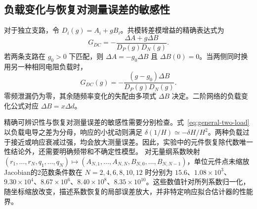 \subsection{负载变化与恢复对测量误差的敏感性}

对于独立支路，令 $D_i(g)=A_i+gB_i$。共模转差模增益的精确表达式为
\begin{equation}\label{eq:general-leakage}
G_{DC}=-\frac{\Delta A+g\Delta B}{D_P(g)D_N(g)}.
\end{equation}
若两条支路在 $g_0>0$ 下匹配，则 $\Delta A=-g_0\Delta B$ 且 $\Delta B(0)=0$。当两侧同时换用另一种相同电阻负载时，
\begin{equation}\label{eq:general-load-shift}
G_{DC}(g)=-\frac{(g-g_0)\Delta B}{D_P(g)D_N(g)}.
\end{equation}
零频泄漏仍为零，其余随频率变化的失配由多项式 $\Delta B$ 决定。二阶网络的负载变化公式对应 $\Delta B=x\Delta d$。

精确可辨识性与恢复对测量误差的敏感性需要分别检查。式~\eqref{eq:general-two-load} 以负载电导之差为分母，响应的小扰动则满足 $\delta(1/H)\simeq-\delta H/H^2$。两种负载过于接近或响应衰减过强，均会放大测量误差。因此，实验中的元件恢复除代数唯一性结论外，还需要明确频带和不确定性模型。
对无量纲系数映射 $(r_1,\ldots,r_N,q_1,\ldots,q_N)\mapsto(A_{N,1},\ldots,A_{N,N},B_{N,0},\ldots,B_{N,N-1})$，单位元件点未缩放Jacobian的2范数条件数在 $N=2,4,6,8,10,12$ 时分别为 $15.6$、$1.08\times10^3$、$9.30\times10^4$、$8.67\times10^6$、$8.40\times10^8$、$8.35\times10^{10}$。这些数值针对所列系数归一化，随坐标缩放改变，描述系数恢复的局部误差放大，并非特定响应拟合估计器的性能界。
\FloatBarrier
